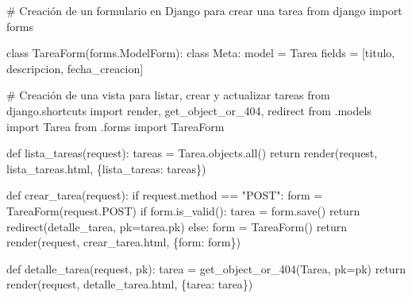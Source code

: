 \documentclass[
  a4paper,
  DIV=11,
  numbers=noendperiod,
  onepage,
  openany]{scrreprt}
\newenvironment{Shaded}{\begin{snugshade}}{\end{snugshade}}
\newcommand{\BuiltInTok}[1]{\textcolor[rgb]{0.00,0.23,0.31}{#1}}
\newcommand{\CommentTok}[1]{\textcolor[rgb]{0.37,0.37,0.37}{#1}}
\newcommand{\ControlFlowTok}[1]{\textcolor[rgb]{0.00,0.23,0.31}{#1}}
\newcommand{\ImportTok}[1]{\textcolor[rgb]{0.00,0.46,0.62}{#1}}
\newcommand{\KeywordTok}[1]{\textcolor[rgb]{0.00,0.23,0.31}{#1}}
\newcommand{\NormalTok}[1]{\textcolor[rgb]{0.00,0.23,0.31}{#1}}
\newcommand{\OperatorTok}[1]{\textcolor[rgb]{0.37,0.37,0.37}{#1}}
\newcommand{\StringTok}[1]{\textcolor[rgb]{0.13,0.47,0.30}{#1}}
\begin{document}
\begin{Shaded}
\begin{Highlighting}[]
\CommentTok{\# Creación de un formulario en Django para crear una tarea}
\ImportTok{from}\NormalTok{ django }\ImportTok{import}\NormalTok{ forms}

\KeywordTok{class}\NormalTok{ TareaForm(forms.ModelForm):}
    \KeywordTok{class}\NormalTok{ Meta:}
\NormalTok{        model }\OperatorTok{=}\NormalTok{ Tarea}
\NormalTok{        fields }\OperatorTok{=}\NormalTok{ [}\StringTok{\textquotesingle{}titulo\textquotesingle{}}\NormalTok{, }\StringTok{\textquotesingle{}descripcion\textquotesingle{}}\NormalTok{, }\StringTok{\textquotesingle{}fecha\_creacion\textquotesingle{}}\NormalTok{]}
\end{Highlighting}
\end{Shaded}

\begin{Shaded}
\begin{Highlighting}[]
\CommentTok{\# Creación de una vista para listar, crear y actualizar tareas}
\ImportTok{from}\NormalTok{ django.shortcuts }\ImportTok{import}\NormalTok{ render, get\_object\_or\_404, redirect}
\ImportTok{from}\NormalTok{ .models }\ImportTok{import}\NormalTok{ Tarea}
\ImportTok{from}\NormalTok{ .forms }\ImportTok{import}\NormalTok{ TareaForm}

\KeywordTok{def}\NormalTok{ lista\_tareas(request):}
\NormalTok{    tareas }\OperatorTok{=}\NormalTok{ Tarea.objects.}\BuiltInTok{all}\NormalTok{()}
    \ControlFlowTok{return}\NormalTok{ render(request, }\StringTok{\textquotesingle{}lista\_tareas.html\textquotesingle{}}\NormalTok{, \{}\StringTok{\textquotesingle{}lista\_tareas\textquotesingle{}}\NormalTok{: tareas\})}

\KeywordTok{def}\NormalTok{ crear\_tarea(request):}
    \ControlFlowTok{if}\NormalTok{ request.method }\OperatorTok{==} \StringTok{"POST"}\NormalTok{:}
\NormalTok{        form }\OperatorTok{=}\NormalTok{ TareaForm(request.POST)}
        \ControlFlowTok{if}\NormalTok{ form.is\_valid():}
\NormalTok{            tarea }\OperatorTok{=}\NormalTok{ form.save()}
            \ControlFlowTok{return}\NormalTok{ redirect(}\StringTok{\textquotesingle{}detalle\_tarea\textquotesingle{}}\NormalTok{, pk}\OperatorTok{=}\NormalTok{tarea.pk)}
    \ControlFlowTok{else}\NormalTok{:}
\NormalTok{        form }\OperatorTok{=}\NormalTok{ TareaForm()}
    \ControlFlowTok{return}\NormalTok{ render(request, }\StringTok{\textquotesingle{}crear\_tarea.html\textquotesingle{}}\NormalTok{, \{}\StringTok{\textquotesingle{}form\textquotesingle{}}\NormalTok{: form\})}

\KeywordTok{def}\NormalTok{ detalle\_tarea(request, pk):}
\NormalTok{    tarea }\OperatorTok{=}\NormalTok{ get\_object\_or\_404(Tarea, pk}\OperatorTok{=}\NormalTok{pk)}
    \ControlFlowTok{return}\NormalTok{ render(request, }\StringTok{\textquotesingle{}detalle\_tarea.html\textquotesingle{}}\NormalTok{, \{}\StringTok{\textquotesingle{}tarea\textquotesingle{}}\NormalTok{: tarea\})}
\end{Highlighting}
\end{Shaded}
\end{document}

